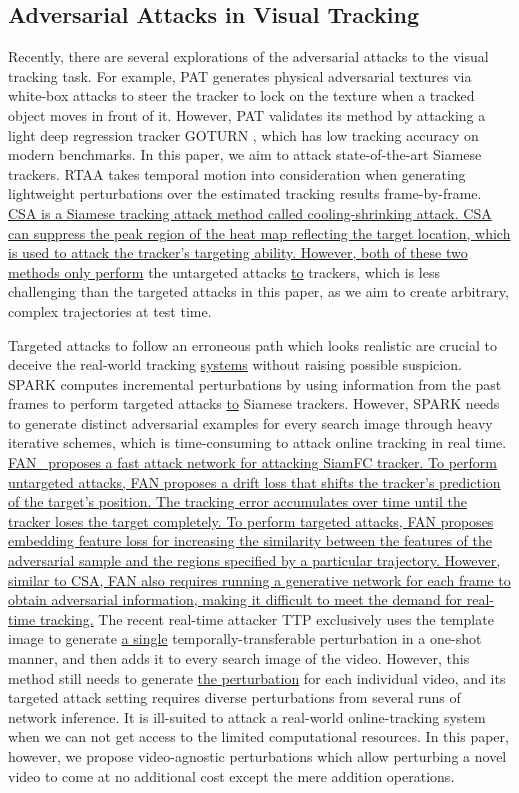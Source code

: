 \documentclass[journal]{IEEEtran}
\begin{document}
\subsection{Adversarial Attacks in Visual Tracking} \label{attacktracker}
Recently, there are several explorations of the adversarial attacks to the visual tracking task. For example, PAT \cite{PAT} generates physical adversarial textures via white-box attacks to steer the tracker to lock on the texture when a tracked object moves in front of it. However, PAT validates its method by attacking a light deep regression tracker GOTURN \cite{GOTURN}, which has low tracking accuracy on modern benchmarks. In this paper, we aim to attack state-of-the-art Siamese trackers. RTAA \cite{RTAA} takes temporal motion into consideration when generating lightweight perturbations over the estimated tracking results frame-by-frame. \uline{CSA \cite{CSA} is a Siamese tracking attack method called cooling-shrinking attack. CSA can suppress the peak region of the heat map reflecting the target location, which is used to attack the tracker's targeting ability. However, both of these two methods only perform} the untargeted attacks \uline{to} trackers, which is less challenging than the targeted attacks in this paper, as we aim to create arbitrary, complex trajectories at test time. 

Targeted attacks to follow an erroneous path which looks realistic are crucial to deceive the real-world tracking \uline{systems} without raising possible suspicion. SPARK \cite{SPARK} computes incremental perturbations by using information from the past frames to perform targeted attacks \uline{to} Siamese trackers. However, SPARK needs to generate distinct adversarial examples for every search image through heavy iterative schemes, which is time-consuming to attack online tracking in real time. \uline{FAN~\cite{FAN} proposes a fast attack network for attacking SiamFC tracker. To perform untargeted attacks, FAN proposes a drift loss that shifts the tracker's prediction of the target's position. The tracking error accumulates over time until the tracker loses the target completely. To perform targeted attacks, FAN proposes embedding feature loss for increasing the similarity between the features of the adversarial sample and the regions specified by a particular trajectory. However, similar to CSA, FAN also requires running a generative network for each frame to obtain adversarial information, making it difficult to meet the demand for real-time tracking.} The recent real-time attacker TTP \cite{TTP} exclusively uses the template image to generate \uline{a single} temporally-transferable perturbation in a one-shot manner, and then adds it to every search image of the video. However, this method still needs to generate \uline{the perturbation} for each individual video, and its targeted attack setting requires diverse perturbations from several runs of network inference. It is ill-suited to attack a real-world online-tracking system when we can not get access to the limited computational resources. In this paper, however, we propose video-agnostic perturbations which allow perturbing a novel video to come at no additional cost except the mere addition operations.
\end{document}
